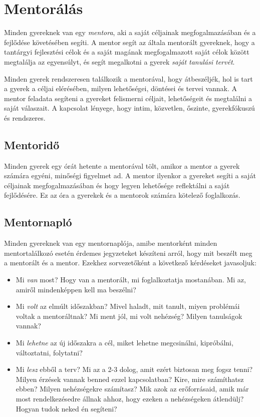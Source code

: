 \hypertarget{mentoralas}{%
\section{Mentorálás}\label{mentoralas}}

Minden gyereknek van egy \emph{mentora}, aki a saját céljainak
megfogalmazásában és a fejlődése követésében segíti. A mentor segít az
általa mentorált gyereknek, hogy a tantárgyi fejlesztési célok és a
saját magának megfogalmazott saját célok között megtalálja az
egyensúlyt, és segít megalkotni a gyerek \emph{saját tanulási tervét}.

Minden gyerek rendszeresen találkozik a mentorával, hogy átbeszéljék, hol
is tart a gyerek a céljai elérésében, milyen lehetőségei, döntései
és tervei vannak. A mentor feladata segíteni a gyereket
felismerni céljait, lehetőségeit és megtalálni a saját válaszait. A
kapcsolat lényege, hogy intim, közvetlen, őszinte, gyerekfókuszú és
rendszeres.

\hypertarget{mentorido}{%
\subsection{Mentoridő}\label{mentorido}}

Minden gyerek egy órát hetente a mentorával tölt, amikor a mentor a
gyerek számára egyéni, minőségi figyelmet ad. A mentor ilyenkor a
gyereket segíti a saját céljainak megfogalmazásában és hogy legyen
lehetősége reflektálni a saját fejlődésére. Ez az óra a gyerekek és a
mentorok számára kötelező foglalkozás.

\hypertarget{mentornaplo}{%
\subsection{Mentornapló}\label{mentornaplo}}

Minden gyereknek van egy mentornaplója, amibe mentorként minden
mentortalálkozó esetén érdemes jegyzeteket készíteni arról, hogy mit
beszélt meg a mentorált és a mentor. Ezekhez sorvezetőként a következő
kérdéseket javasoljuk:

\begin{itemize}
\tightlist
\item
  Mi \emph{van} most? Hogy van a mentorált, mi foglalkoztatja
  mostanában. Mi az, amiről mindenképpen kell ma beszélni?
\item
  Mi \emph{volt} az elmúlt időszakban? Mivel haladt, mit tanult, miyen
  problémái voltak a mentoráltnak? Mi ment jól, mi volt nehézség? Milyen
  tanulságok vannak?
\item
  Mi \emph{lehetne} az új időszakra a cél, miket lehetne megcsinálni,
  kipróbálni, változtatni, folytatni?
\item
  Mi \emph{lesz} ebből a terv? Mi az a 2-3 dolog, amit ezért biztosan
  meg fogsz tenni? Milyen érzések vannak benned ezzel kapcsolatban?
  Kire, mire számíthatsz ebben? Milyen nehézségekre számítasz? Mik azok
  az erőforrásaid, amik már most rendelkezésedre állnak ahhoz, hogy
  ezeken a nehézségeken átlendülj? Hogyan tudok neked én segíteni?
\end{itemize}

